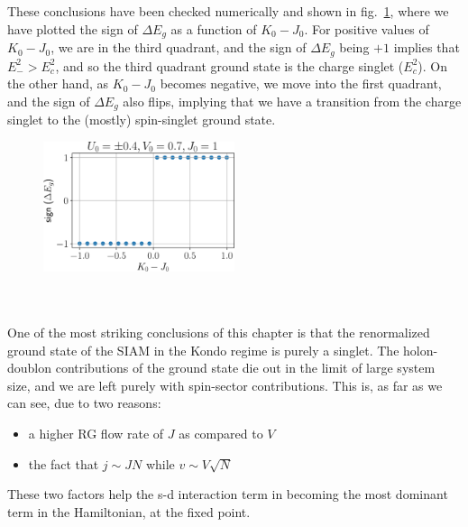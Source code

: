 \documentclass[twoside,11pt]{report}
\numberwithin{equation}{section}
\begin{document}
\\\\These conclusions have been checked numerically and shown in fig.~\ref{fig_gstate}, where we have plotted the sign of \(\Delta E_g\) as a function of \(K_0 - J_0\). For positive values of \(K_0 - J_0\), we are in the third quadrant, and the sign of \(\Delta E_g\) being \(+1\) implies that \(E_-^2 > E_c^2\), and so the third quadrant ground state is the charge singlet (\(E_c^2\)). On the other hand, as \(K_0 - J_0\) becomes negative, we move into the first quadrant, and the sign of \(\Delta E_g\) also flips, implying that we have a transition from the charge singlet to the (mostly) spin-singlet ground state.
\begin{figure}[htpb]
	\centering
	\includegraphics[width=0.5\textwidth]{../figures/gstate.pdf}
	\label{fig_gstate}
\end{figure}
\\\\One of the most striking conclusions of this chapter is that the renormalized ground state of the SIAM in the Kondo regime is purely a singlet. The holon-doublon contributions of the ground state die out in the limit of large system size, and we are left purely with spin-sector contributions. This is, as far as we can see, due to two reasons: 
\begin{itemize}
	\item a higher RG flow rate of \(J\) as compared to \(V\)
	\item the fact that \(j \sim J N\) while \(v \sim V\sqrt N \)
\end{itemize}
These two factors help the s-d interaction term in becoming the most dominant term in the Hamiltonian, at the fixed point.
\end{document}

